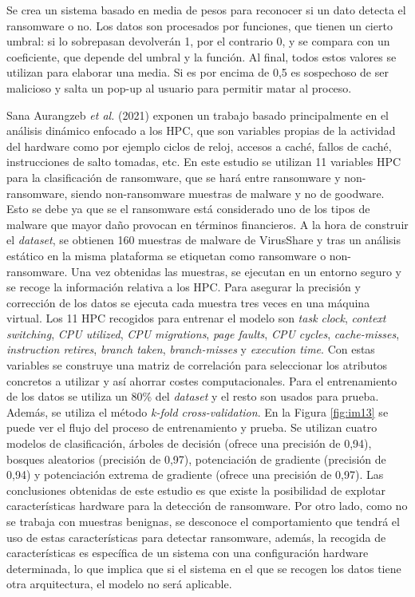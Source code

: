 Se crea un sistema basado en media de pesos para reconocer si un dato detecta el ransomware o no. Los datos son procesados por funciones, que tienen un cierto umbral: si lo sobrepasan devolverán 1, por el contrario 0, y se compara con un coeficiente, que depende del umbral y la función. Al final, todos estos valores se utilizan para elaborar una media. Si es por encima de 0,5 es sospechoso de ser malicioso y salta un pop-up al usuario para permitir matar al proceso.

Sana Aurangzeb \textit{et al.} (2021) \cite{Aurangzeb2021} exponen un trabajo basado principalmente en el análisis dinámico enfocado a los \gls{HPC}, que son variables propias de la actividad del hardware como por ejemplo ciclos de reloj, accesos a caché, fallos de caché, instrucciones de salto tomadas, etc. En este estudio se utilizan 11 variables \gls{HPC} para la clasificación de ransomware, que se hará entre ransomware y non-ransomware, siendo non-ransomware muestras de malware y no de goodware. Esto se debe ya que se el ransomware está considerado uno de los tipos de malware que mayor daño provocan en términos financieros. 
A la hora de construir el \textit{dataset}, se obtienen 160 muestras de malware de VirusShare y tras un análisis estático en la misma plataforma se etiquetan como ransomware o non-ransomware. Una vez obtenidas las muestras, se ejecutan en un entorno seguro y se recoge la información relativa a los \gls{HPC}. Para asegurar la precisión y corrección de los datos se ejecuta cada muestra tres veces en una máquina virtual. Los 11 \gls{HPC} recogidos para entrenar el modelo son \textit{task clock}, \textit{context switching}, \textit{\gls{CPU} utilized}, \textit{\gls{CPU} migrations}, \textit{page faults}, \textit{\gls{CPU} cycles}, \textit{cache-misses}, \textit{instruction retires}, \textit{branch taken}, \textit{branch-misses} y \textit{execution time}. Con estas variables se construye una matriz de correlación para seleccionar los atributos concretos a utilizar y así ahorrar costes computacionales.
Para el entrenamiento de los datos se utiliza un 80\% del \textit{dataset} y el resto son usados para prueba. Además, se utiliza el método \textit{k-fold cross-validation}.
En la Figura \ref{fig:im13} se puede ver el flujo del proceso de entrenamiento y prueba.
Se utilizan cuatro modelos de clasificación, árboles de decisión (ofrece una precisión de 0,94), bosques aleatorios (precisión de 0,97), potenciación de gradiente (precisión de 0,94) y potenciación extrema de gradiente (ofrece una precisión de 0,97).
Las conclusiones obtenidas de este estudio es que existe la posibilidad de explotar características hardware para la detección de ransomware. Por otro lado, como no se trabaja con muestras benignas, se desconoce el comportamiento que tendrá el uso de estas características para detectar ransomware, además, la recogida de características es específica de un sistema con una configuración hardware determinada, lo que implica que si el sistema en el que se recogen los datos tiene otra arquitectura, el modelo no será aplicable.

